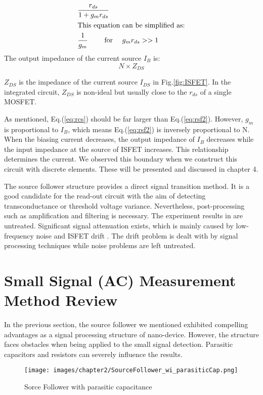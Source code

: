 \begin{align}
    & \frac{r_{ds}}{1 + g_mr_{ds}}\\
\intertext{This equation can be simplified as:}
    & \frac{1}{g_m} \qquad \text{ for } \quad g_mr_{ds} >> 1 \label{eq:rsf2}
\end{align}
The output impedance of the current source $I_B$ is:
\begin{equation} \label{eq:rcs}
    N\times Z_{DS}
\end{equation}

$Z_{DS}$ is the impedance of the current source $I_{DS}$ in Fig.\ref{fig:ISFET}.
In the integrated circuit, $Z_{DS}$ is non-ideal but usually close to the $r_{ds}$ of a single MOSFET.

As mentioned, Eq.(\ref{eq:rcs}) should be far larger than Eq.(\ref{eq:rsf2}).
However, $g_m$ is proportional to $I_B$, which means Eq.(\ref{eq:rsf2}) is inversely proportional to N.
When the biasing current decreases, the output impedance of $I_B$ decreases while the input impedance at the source of ISFET increases.
This relationship determines the current.
We observed this boundary when we construct this circuit with discrete elements.
These will be presented and discussed in chapter 4.

The source follower structure provides a direct signal transition method.
It is a good candidate for the read-out circuit with the aim of detecting transconductance or threshold voltage variance.
Nevertheless, post-processing such as amplification and filtering is necessary.
The experiment results in \cite{SF1} are untreated.
Significant signal attenuation exists, which is mainly caused by low-frequency noise and ISFET drift \cite{Drift}.
The drift problem is dealt with by signal processing techniques while noise problems are left untreated.


\section{Small Signal (AC) Measurement Method Review}  \label{sec:AC}
In the previous section, the source follower we mentioned exhibited compelling advantages as a signal processing structure of nano-device.
However, the structure faces obstacles when being applied to the small signal detection.
Parasitic capacitors and resistors can severely influence the results.

\begin{figure}[ht]
    \centering
    \texttt{[image: images/chapter2/SourceFollower\_wi\_parasiticCap.png]}
    \fontsize{6}{7}\selectfont
    \caption{Sorce Follower with parasitic capacitance}
    \label{fig:SF_pC}
\end{figure}

